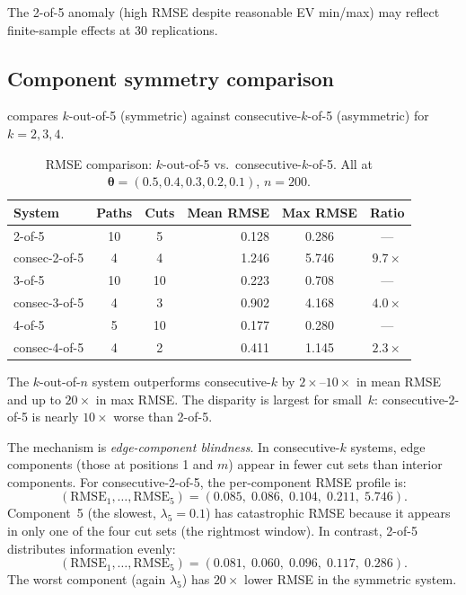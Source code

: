\documentclass[12pt]{article}
\theoremstyle{definition}
\theoremstyle{remark}
\newcommand{\bthet}{\boldsymbol{\theta}}
\begin{document}
The 2-of-5 anomaly (high RMSE despite reasonable EV min/max) may
reflect finite-sample effects at 30 replications.


\subsection{Component symmetry comparison}
\label{sec:res_symmetry}

 compares $k$-out-of-5 (symmetric) against
consecutive-$k$-of-5 (asymmetric) for $k = 2, 3, 4$.

\begin{table}[htbp]
  \centering
  \caption{RMSE comparison: $k$-out-of-5 vs.\ consecutive-$k$-of-5.
    All at $\bthet = (0.5, 0.4, 0.3, 0.2, 0.1)$, $n = 200$.}
  \label{tab:symmetry}
  \begin{tabular}{lccrcc}
    \toprule
    System & Paths & Cuts & Mean RMSE & Max RMSE & Ratio \\
    \midrule
    2-of-5        & 10 & 5  & 0.128 & 0.286 & --- \\
    consec-2-of-5 & 4  & 4  & 1.246 & 5.746 & $9.7\times$ \\
    \midrule
    3-of-5        & 10 & 10 & 0.223 & 0.708 & --- \\
    consec-3-of-5 & 4  & 3  & 0.902 & 4.168 & $4.0\times$ \\
    \midrule
    4-of-5        & 5  & 10 & 0.177 & 0.280 & --- \\
    consec-4-of-5 & 4  & 2  & 0.411 & 1.145 & $2.3\times$ \\
    \bottomrule
  \end{tabular}
\end{table}

The $k$-out-of-$n$ system outperforms consecutive-$k$ by
$2\times$--$10\times$ in mean RMSE and up to $20\times$ in max RMSE.
The disparity is largest for small~$k$: consecutive-2-of-5 is nearly
$10\times$ worse than 2-of-5.

The mechanism is \emph{edge-component blindness}.  In consecutive-$k$
systems, edge components (those at positions 1 and $m$) appear in
fewer cut sets than interior components.  For consecutive-2-of-5, the
per-component RMSE profile is:
\[
  (\text{RMSE}_1, \ldots, \text{RMSE}_5)
  = (0.085, \; 0.086, \; 0.104, \; 0.211, \; 5.746).
\]
Component~5 (the slowest, $\lambda_5 = 0.1$) has catastrophic RMSE
because it appears in only one of the four cut sets (the rightmost
window).  In contrast, 2-of-5 distributes information evenly:
\[
  (\text{RMSE}_1, \ldots, \text{RMSE}_5)
  = (0.081, \; 0.060, \; 0.096, \; 0.117, \; 0.286).
\]
The worst component (again $\lambda_5$) has $20\times$ lower RMSE in
the symmetric system.
\end{document}
